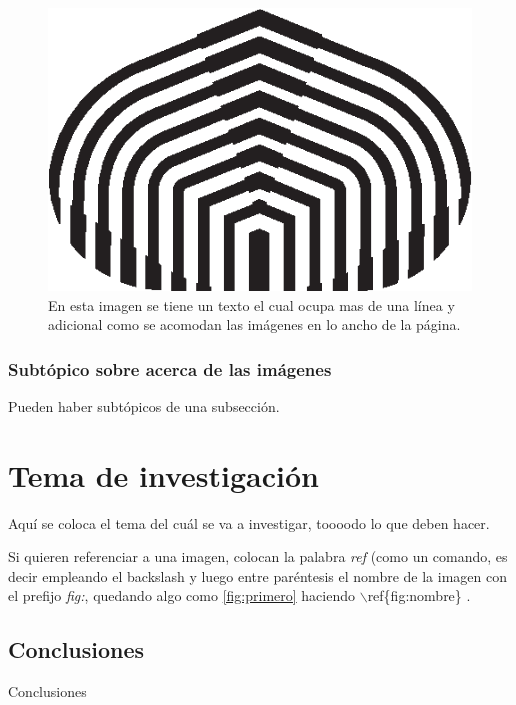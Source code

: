\documentclass{cgusb}
\numberwithin{equation}{section} %
\begin{document}
\begin{figure}[tcb]
  \else
    \includegraphics{logo.eps}
  \fi
  \hfill \mbox{}
  \caption{\label{fig:nombre}%
           En esta imagen se tiene un texto el cual ocupa mas de una línea
           y adicional como se acomodan las imágenes en lo ancho de la página.}
\end{figure}

\subsubsection*{Subtópico sobre acerca de las imágenes}

Pueden haber subtópicos de una subsección.

\section{Tema de investigación}

Aquí se coloca el tema del cuál se va a investigar, toooodo lo que deben hacer.

Si quieren referenciar a una imagen, colocan la palabra \textit{ref} (como un comando, es decir
empleando el backslash y luego entre paréntesis el nombre de la imagen con el prefijo \textit{fig:}, 
quedando algo como \ref{fig:primero} haciendo $\backslash$ref\{fig:nombre\} .

\subsection{Conclusiones}

Conclusiones



\end{document}
